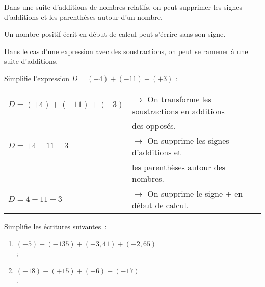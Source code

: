  

\begin{methode*1}

\begin{aconnaitre}
Dans une suite d'additions de nombres relatifs, on peut supprimer les signes d'additions et les parenthèses autour d'un nombre.

Un nombre positif écrit en début de calcul peut s'écrire sans son signe.
\end{aconnaitre}

\begin{remarque}
Dans le cas d'une expression avec des soustractions, on peut se ramener à une suite d'additions.
 \end{remarque}

 \begin{exemple*1}
Simplifie l'expression $D = (+4) + (-11) - (+3)$ :
\begin{tabular}{ll} 
$D = (+4) + (-11) + (-3)$ & $\rightarrow$ On transforme les soustractions en additions \\
 & \phantom{$\rightarrow$} des opposés. \\
$D = +4 - 11 - 3$ & $\rightarrow$ On supprime les signes d'additions et \\
 & \phantom{$\rightarrow$} les parenthèses autour des nombres. \\
$D = 4 - 11 - 3$ & $\rightarrow$ On supprime le signe $+$ en début de calcul. \\
\end{tabular}
 \end{exemple*1}

\exercice
Simplifie les écritures suivantes :
\vspace{0.8em}
\begin{enumerate}
 \item $(-5) - (-135) + (+3,41) + (-2,65)$ \dotfill \\[.4em]
 
 \dotfill; \\[.4em]
 
 \item $(+18) - (+15) + (+6) - (-17)$ \dotfill \\[.4em]
 
 \dotfill.
 \end{enumerate}

\end{methode*1}

